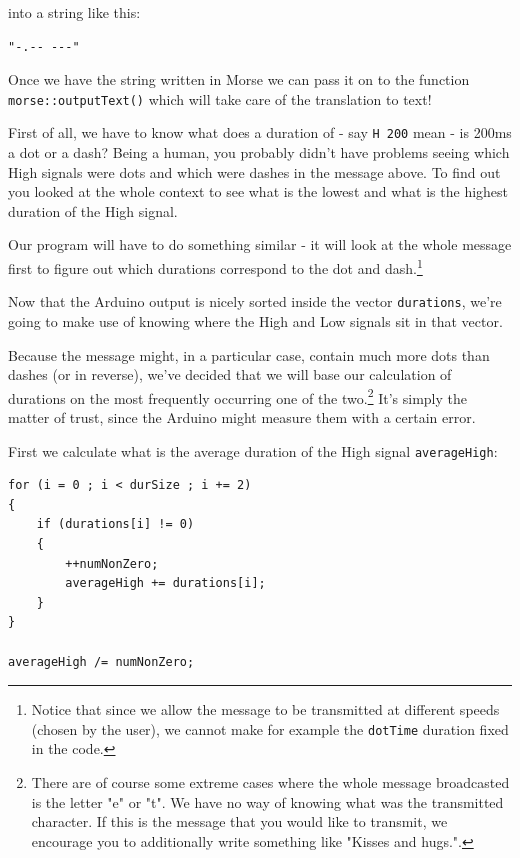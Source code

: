 \documentclass[10pt]{report}
\begin{document}
into a string like this:

\begin{snugshade}
\begin{verbatim}
"-.-- ---"
\end{verbatim}
\end{snugshade}

Once we have the string written in Morse we can pass it on to the function \texttt{morse::outputText()} which will take care of the translation to text!

First of all, we have to know what does a duration of - say \texttt{H 200} mean - is 200ms a dot or a dash? Being a human, you probably didn't have problems seeing which High signals were dots and which were dashes in the message above. To find out you looked at the whole context to see what is the lowest and what is the highest duration of the High signal.

Our program will have to do something similar - it will look at the whole message first to figure out which durations correspond to the dot and dash.\footnote{Notice that since we allow the message to be transmitted at different speeds (chosen by the user), we cannot make for example the \texttt{dotTime} duration fixed in the code.}

Now that the Arduino output is nicely sorted inside the vector \texttt{durations}, we're going to make use of knowing where the High and Low signals sit in that vector.  

Because the message might, in a particular case, contain much more dots than dashes (or in reverse), we've decided that we will base our calculation of durations on the most frequently occurring one of the two.\footnote{There are of course some extreme cases where the whole message broadcasted is the letter "e" or "t". We have no way of knowing what was the transmitted character. If this is the message that you would like to transmit, we encourage you to additionally write something like "Kisses and hugs.".} It's simply the matter of trust, since the Arduino might measure them with a certain error.

First we calculate what is the average duration of the High signal \texttt{averageHigh}:

\begin{lstlisting}
for (i = 0 ; i < durSize ; i += 2)
{
	if (durations[i] != 0)
	{
		++numNonZero;
		averageHigh += durations[i];
	}
}

averageHigh /= numNonZero;
\end{lstlisting}
\end{document}
